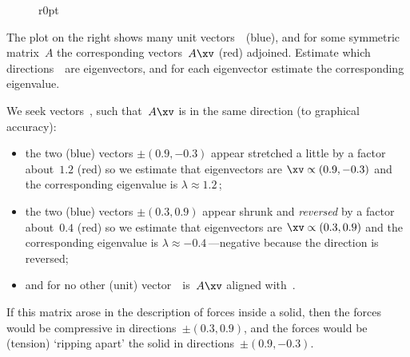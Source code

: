 \begin{wrapfigure}[6]r{0pt}
\def\eRosesize{small}%
\end{wrapfigure}
\begin{example} \label{eg:eig2pic2}
The plot on the right shows many unit vectors~\xv\  (blue), and for some symmetric matrix~\(A\) the corresponding vectors~\(A\xv\) (red) adjoined. 
Estimate which directions~\xv\ are eigenvectors, and for each eigenvector estimate the corresponding eigenvalue.

\begin{solution} 
We seek vectors~\xv, such that~\(A\xv\) is in the same direction (to graphical accuracy):  \begin{itemize}
\item the two (blue) vectors \(\pm(0.9,-0.3)\) appear stretched a little by a factor about~\(1.2\) (red) so we estimate that eigenvectors are \(\xv\propto(0.9,-0.3)\) and the corresponding eigenvalue is \(\lambda\approx1.2\)\,;
\item the two (blue) vectors \(\pm(0.3,0.9)\)  appear shrunk and \emph{reversed} by a factor about~\(0.4\) (red) so we estimate that eigenvectors are \(\xv\propto(0.3,0.9)\) and the corresponding eigenvalue is \(\lambda\approx-0.4\)\,---negative because the direction is reversed;
\item and for no other (unit) vector~\xv\ is~\(A\xv\) aligned with~\xv.
\end{itemize}
If this matrix arose in the description of forces inside a solid, then the forces would be compressive in directions~\(\pm(0.3,0.9)\), and the forces would be (tension) `ripping apart' the solid in  directions~\(\pm(0.9,-0.3)\).
\end{solution}
\end{example}


